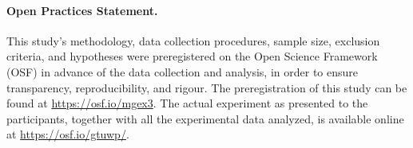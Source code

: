 \documentclass[a4paper,11pt]{article}
\theoremstyle{plain}
\theoremstyle{plain}
\begin{document}




 







\paragraph{Open Practices Statement.} This study's methodology, data collection procedures, sample size, exclusion criteria, and hypotheses were preregistered on the Open Science Framework (OSF) in advance of the data collection and analysis, in order to ensure transparency, reproducibility, and rigour. The preregistration of this study can be found at \url{https://osf.io/mgex3}. The actual experiment as presented to the participants, together with all the experimental data analyzed, is available online at \url{https://osf.io/gtuwp/}.


 



\end{document}
